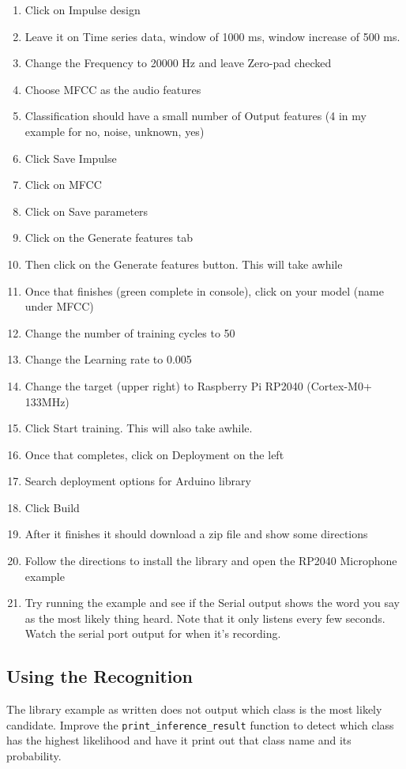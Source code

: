 \begin{enumerate}
  \item Click on Impulse design
  \item Leave it on Time series data, window of 1000 ms, window increase of 500 ms.
  \item Change the Frequency to 20000 Hz and leave Zero-pad checked
  \item Choose MFCC as the audio features
  \item Classification should have a small number of Output features 
          (4 in my example for no, noise, unknown, yes)
  \item Click Save Impulse
  \item Click on MFCC
  \item Click on Save parameters
  \item Click on the Generate features tab
  \item Then click on the Generate features button. This will take awhile
  \item Once that finishes (green complete in console), click on your model 
          (name under MFCC)
  \item Change the number of training cycles to 50
  \item Change the Learning rate to 0.005
  \item Change the target (upper right) to Raspberry Pi RP2040 (Cortex-M0+ 133MHz)
  \item Click Start training. This will also take awhile.
  \item Once that completes, click on Deployment on the left 
  \item Search deployment options for Arduino library
  \item Click Build
  \item After it finishes it should download a zip file and show some directions
  \item Follow the directions to install the library and open the RP2040 Microphone example 
  \item Try running the example and see if the Serial output shows the word you say as the 
          most likely thing heard. Note that it only listens every few seconds. Watch the 
          serial port output for when it's recording.
\end{enumerate}

\subsection{Using the Recognition}
The library example as written does not output which class is the most likely candidate.
Improve the \lstinline|print_inference_result| function to detect which class has the 
highest likelihood and have it print out that class name and its probability.


